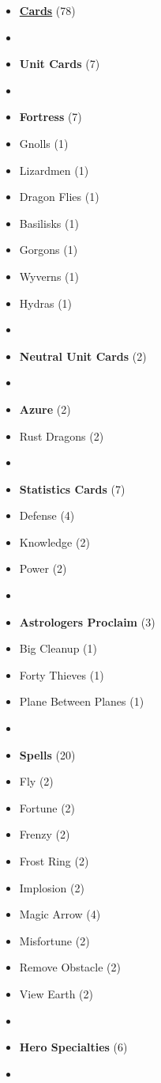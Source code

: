 \begin{multicols*}{3}
\begin{itemize}[leftmargin=0pt, label={}, noitemsep]
  \item \textbf{\small{\underline{Cards}}} (78)
  \item
  \item \textbf{Unit Cards} (7)
  \item
  \item \textbf{Fortress} (7)
  \item Gnolls (1)
  \item Lizardmen (1)
  \item Dragon Flies (1)
  \item Basilisks (1)
  \item Gorgons (1)
  \item Wyverns (1)
  \item Hydras (1)
  \item
  \item \textbf{Neutral Unit Cards} (2)
  \item
  \item \textbf{Azure} (2)
  \item Rust Dragons (2)
  \item
  \item \textbf{Statistics Cards} (7)
  \item Defense (4)
  \item Knowledge (2)
  \item Power (2)
  \item
  \item \textbf{Astrologers Proclaim} (3)
  \item Big Cleanup (1)
  \item Forty Thieves (1)
  \item Plane Between Planes (1)
  \item
  \item \textbf{Spells} (20)
  \item Fly (2)
  \item Fortune (2)
  \item Frenzy (2)
  \item Frost Ring (2)
  \item Implosion (2)
  \item Magic Arrow (4)
  \item Misfortune (2)
  \item Remove Obstacle (2)
  \item View Earth (2)
  \item
  \item \textbf{Hero Specialties} (6)
  \item

\end{itemize}
\end{multicols*}
